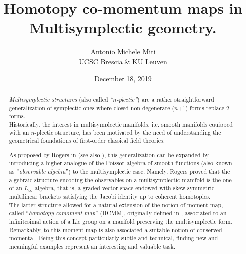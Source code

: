 \documentclass[11pt,a4paper]{article}
\begin{document}
\title{Homotopy co-momentum maps in Multisymplectic geometry.}
\author{Antonio Michele Miti\\ UCSC Brescia \& KU Leuven}

\date{December 18, 2019}
\maketitle


\begin{abstract}


\emph{Multisymplectic structures} (also called \emph{``$n$-plectic''}) are a rather straightforward generalization of symplectic ones where closed non-degenerate 
($n$+$1$)-forms replace $2$-forms.
\\
Historically, the interest in multisymplectic manifolds, i.e. smooth manifolds equipped with an $n$-plectic structure,  has been motivated by
the need of understanding the geometrical foundations of first-order classical field theories.

As proposed by Rogers in \cite{Rogers2010} (see also \cite{Zambon2012}), this generalization can be expanded by introducing a higher analogue of the Poisson algebra of smooth functions (also known as ``\emph{observable algebra}'')  to the multisymplectic case.
Namely, Rogers proved that the algebraic structure encoding the observables on a multisymplectic manifold is the one of an $L_{\infty}$-algebra, that is, a graded vector space endowed with skew-symmetric multilinear brackets satisfying the Jacobi identity up to coherent homotopies.
\\
The latter structure allowed for a natural extension of the notion of moment map, called ``\emph{homotopy comoment map}'' (HCMM), originally defined in \cite{Callies2016}, associated to an infinitesimal action of a Lie group on a manifold preserving the multisymplectic form. Remarkably, to this moment map is also associated a suitable notion of conserved momenta \cite{Ryvkin2016}.
%
Being this concept particularly subtle and technical, finding new and meaningful examples represent an interesting and valuable task.


\end{abstract}
\end{document}
